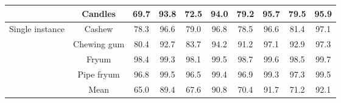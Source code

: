 \documentclass[runningheads]{llncs}
\begin{document}
\begin{table*}[!ht]
{\begin{tabular}{cc|cccc|cccc}
    \multicolumn{1}{c|}{}                                    & Candles     & 69.7  & 93.8                        & 72.5        & 94.0        & 79.2  & 95.7                        & 79.5       & 95.9        \\ \hline
    \multicolumn{1}{c|}{\multirow{4}{*}{Single instance}}    & Cashew      & 78.3  & 96.6                        & 79.0        & 96.8        & 78.5  & 96.6                        & 81.4       & 97.1        \\
    \multicolumn{1}{c|}{}                                    & Chewing gum & 80.4  & 92.7                        & 83.7        & 94.2        & 91.2  & 97.1                        & 92.9       & 97.3        \\
    \multicolumn{1}{c|}{}                                    & Fryum       & 98.4  & 99.3                        & 98.1        & 99.5        & 98.7  & 99.6                        & 98.5       & 99.7        \\
    \multicolumn{1}{c|}{}                                    & Pipe fryum  & 96.8  & 99.5                        & 96.5        & 99.4        & 96.9  & 99.3                        & 97.3       & 99.5        \\ \hline
    \multicolumn{1}{c|}{}                                    & Mean        &   65.0    &  89.4 & 67.6 & 90.8 & 70.4 & 91.7 & 71.2 & 92.1           \\ \hline
    \end{tabular}}
\end{table*}
\end{document}
